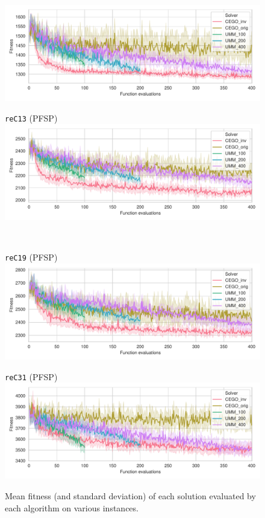 \documentclass[sigconf,dvipsnames]{acmart}
\begin{document}
{\begin{figure}
\begin{minipage}{0.49\linewidth}
  \includegraphics[width=\textwidth]{../img/fitness_pfsp_rec05_txt}
\end{minipage}
\begin{minipage}{0.49\linewidth}
  \texttt{reC13} (PFSP)\\[-0.5ex]
  \includegraphics[width=\textwidth]{../img/fitness_pfsp_rec13_txt}
\end{minipage}
\\
\begin{minipage}{0.49\linewidth}
  \texttt{reC19} (PFSP)\\[-0.5ex]
  \includegraphics[width=\textwidth]{../img/fitness_pfsp_rec19_txt}
\end{minipage}
\begin{minipage}{0.49\linewidth}
  \texttt{reC31} (PFSP)\\[-0.5ex]
  \includegraphics[width=\textwidth]{../img/fitness_pfsp_rec31_txt}
\end{minipage}
\label{fig:results}
\caption{Mean fitness  (and standard deviation)  of each solution evaluated by each algorithm on various instances.\label{fig:results}}
\vspace{10em}
\end{figure}
}
\end{document}
